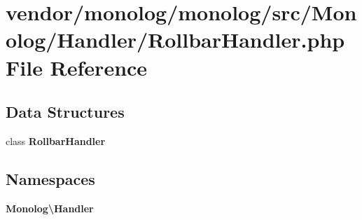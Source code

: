 \section{vendor/monolog/monolog/src/\+Monolog/\+Handler/\+Rollbar\+Handler.php File Reference}
\label{_rollbar_handler_8php}
\subsection*{Data Structures}
\begin{DoxyCompactItemize}
\item 
class {\bf Rollbar\+Handler}
\end{DoxyCompactItemize}
\subsection*{Namespaces}
\begin{DoxyCompactItemize}
\item 
 {\bf Monolog\textbackslash{}\+Handler}
\end{DoxyCompactItemize}
